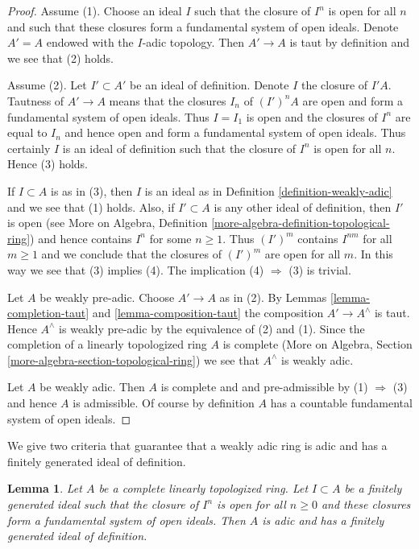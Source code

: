 \documentclass{stacks-project}
\theoremstyle{plain}
\newtheorem{lemma}[subsection]{Lemma}
\theoremstyle{definition}
\theoremstyle{remark}
\numberwithin{equation}{subsection}
\begin{document}
\begin{proof}
Assume (1). Choose an ideal $I$ such that the closure
of $I^n$ is open for all $n$ and such that these closures form
a fundamental system of open ideals. Denote $A' = A$ endowed with
the $I$-adic topology. Then $A' \to A$ is taut by definition and
we see that (2) holds.

\medskip\noindent
Assume (2). Let $I' \subset A'$ be an ideal of definition.
Denote $I$ the closure of $I'A$. Tautness of $A' \to A$ means
that the closures $I_n$ of $(I')^nA$ are open and form a fundamental system of
open ideals. Thus $I = I_1$ is open and the closures of $I^n$
are equal to $I_n$ and hence open and form a fundamental system of
open ideals. Thus certainly $I$ is an ideal of definition
such that the closure of $I^n$ is open for all $n$. Hence (3) holds.

\medskip\noindent
If $I \subset A$ is as in (3), then $I$ is an ideal as in
Definition \ref{definition-weakly-adic} and we see that (1) holds.
Also, if $I' \subset A$ is any other ideal of definition, then
$I'$ is open (see More on Algebra, Definition
\ref{more-algebra-definition-topological-ring})
and hence contains $I^n$ for some $n \geq 1$.
Thus $(I')^m$ contains $I^{nm}$ for all $m \geq 1$ and we
conclude that the closures of $(I')^m$ are open for all $m$.
In this way we see that (3) implies (4).
The implication (4) $\Rightarrow$ (3) is trivial.

\medskip\noindent
Let $A$ be weakly pre-adic. Choose $A' \to A$ as in (2).
By Lemmas \ref{lemma-completion-taut} and
\ref{lemma-composition-taut}
the composition $A' \to A^\wedge$ is taut. Hence $A^\wedge$
is weakly pre-adic by the equivalence of (2) and (1).
Since the completion of a linearly topologized ring $A$ is complete
(More on Algebra, Section \ref{more-algebra-section-topological-ring})
we see that $A^\wedge$ is weakly adic.

\medskip\noindent
Let $A$ be weakly adic. Then $A$ is complete and
and pre-admissible by (1) $\Rightarrow$ (3) and hence $A$
is admissible. Of course by definition $A$ has a countable
fundamental system of open ideals.
\end{proof}

\noindent
We give two criteria that guarantee that a weakly adic ring
is adic and has a finitely generated ideal of definition.

\begin{lemma}
\label{lemma-weakly-adic-finite-generation-bis}
Let $A$ be a complete linearly topologized ring. Let $I \subset A$ be a
finitely generated ideal such that the closure of $I^n$ is open for all
$n \geq 0$ and these closures form a fundamental system of open ideals.
Then $A$ is adic and has a finitely generated ideal of definition.
\end{lemma}
\end{document}
